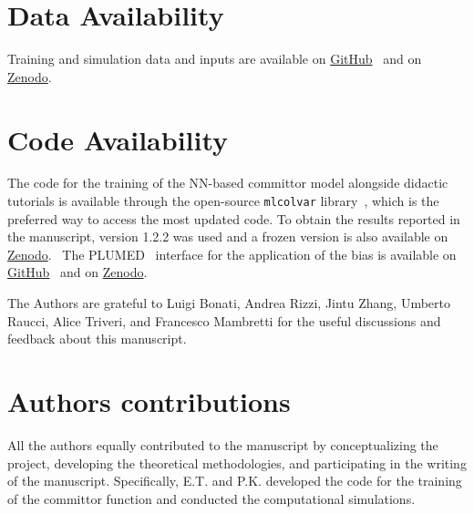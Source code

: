 \documentclass[aip,reprint]{revtex4-1}
\begin{document}
\maketitle %



\section*{Data Availability} \label{sec:code_avail}
    Training and simulation data and inputs are available on \hyperlink{https://github.com/EnricoTrizio/committor\_2.0}{GitHub}~\cite{trizio2025github} and on \hyperlink{https://zenodo.org/records/15089373}{Zenodo}.~\cite{trizio2025dataset} 

\section*{Code Availability} \label{sec:code_avail}
    The code for the training of the NN-based committor model alongside didactic tutorials is available through the open-source \texttt{mlcolvar} library~\cite{bonati2023mlcolvar}, which is the preferred way to access the most updated code. To obtain the results reported in the manuscript, version 1.2.2 was used and a frozen version is also available on \hyperlink{https://zenodo.org/records/15089373}{Zenodo}.~\cite{trizio2025dataset}
    The PLUMED~\cite{tribello2014plumed, plumed2019promoting} interface for the application of the bias is available on \hyperlink{https://github.com/EnricoTrizio/committor\_2.0}{GitHub}~\cite{trizio2025github} and on \hyperlink{https://zenodo.org/records/15089373}{Zenodo}.~\cite{trizio2025dataset}

\begin{acknowledgments}
    The Authors are grateful to Luigi Bonati, Andrea Rizzi, Jintu Zhang, Umberto Raucci, Alice Triveri, and Francesco Mambretti for the useful discussions and feedback about this manuscript. 
\end{acknowledgments}

\section*{Authors contributions}
    All the authors equally contributed to the manuscript by conceptualizing the project, developing the theoretical methodologies, and participating in the writing of the manuscript.
    Specifically, E.T. and P.K. developed the code for the training of the committor function and conducted the computational simulations.
\end{document}
